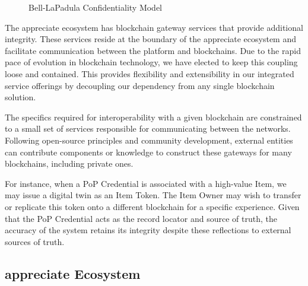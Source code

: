 \documentclass[a4paper,onecolumn, 10.5pt]{article}
\begin{document}
\begin{figure}[!htb]
	\centering %
	\caption{Bell-LaPadula Confidentiality Model}
	\label{fig: bella}
\end{figure}


The appreciate ecosystem has blockchain gateway services that provide additional integrity. These services reside at the boundary of the appreciate ecosystem and facilitate communication between the platform and blockchains. Due to the rapid pace of evolution in blockchain technology, we have elected to keep this coupling loose and contained. This provides flexibility and extensibility in our integrated service offerings by decoupling our dependency from any single blockchain solution.

The specifics required for interoperability with a given blockchain are constrained to a small set of services responsible for communicating between the networks. Following open-source principles and community development, external entities can contribute components or knowledge to construct these gateways for many blockchains, including private ones. 



For instance, when a PoP Credential is associated with a high-value Item, we may issue a digital twin as an Item Token\cite{nfts}. The Item Owner may wish to transfer or replicate this token onto a different blockchain for a specific experience. Given that the PoP Credential acts as the record locator and source of truth, the accuracy of the system retains its integrity despite these reflections to external sources of truth.



\subsection{appreciate Ecosystem}
\end{document}
